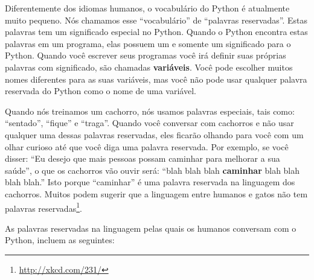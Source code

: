 Diferentemente dos idiomas humanos, o vocabulário do Python é atualmente muito pequeno.
Nós chamamos esse ``vocabulário'' de ``palavras reservadas''. Estas palavras tem
um significado especial no Python. Quando o Python encontra estas palavras em um
programa, elas possuem um e somente um significado para o Python. Quando você
escrever seus programas você irá definir suas próprias palavras com significado,
são chamadas {\bf variáveis}. Você pode escolher muitos nomes diferentes para
as suas variáveis, mas você não pode usar qualquer palavra reservada do Python
como o nome de uma variável.
%

Quando nós treinamos um cachorro, nós usamos palavras especiais, tais como:
``sentado'', ``fique'' e ``traga''. Quando você conversar com cachorros e
não usar qualquer uma dessas palavras reservadas, eles ficarão olhando para você
com um olhar curioso até que você diga uma palavra reservada.
Por exemplo, se você disser: ``Eu desejo que mais pessoas possam caminhar para
melhorar a sua saúde'', o que os cachorros vão ouvir será:
``blah blah blah {\bf caminhar} blah blah blah blah.''
Isto porque ``caminhar'' é uma palavra reservada na linguagem dos cachorros. Muitos
podem sugerir que a linguagem entre humanos e gatos não tem palavras
reservadas\footnote{\url{http://xkcd.com/231/}}.
%

As palavras reservadas na linguagem pelas quais os humanos conversam com o
Python, incluem as seguintes:
%

